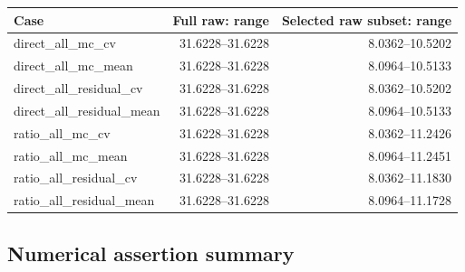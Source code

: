 \begin{center}\small\begin{tabular}{lrr}\toprule

Case & Full raw: range & Selected raw subset: range\\\midrule

direct\_all\_mc\_cv & 31.6228--31.6228 & 8.0362--10.5202\\

direct\_all\_mc\_mean & 31.6228--31.6228 & 8.0964--10.5133\\

direct\_all\_residual\_cv & 31.6228--31.6228 & 8.0362--10.5202\\

direct\_all\_residual\_mean & 31.6228--31.6228 & 8.0964--10.5133\\

ratio\_all\_mc\_cv & 31.6228--31.6228 & 8.0362--11.2426\\

ratio\_all\_mc\_mean & 31.6228--31.6228 & 8.0964--11.2451\\

ratio\_all\_residual\_cv & 31.6228--31.6228 & 8.0362--11.1830\\

ratio\_all\_residual\_mean & 31.6228--31.6228 & 8.0964--11.1728\\

\bottomrule\end{tabular}\end{center}

\subsection{Numerical assertion summary}

